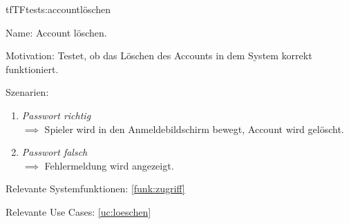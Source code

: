 \begin{description}[leftmargin=5em, style=sameline]

\begin{lhp}{tf}{TF}{tests:accountlöschen}
	\item [Name:] Account löschen.
	\item [Motivation:] Testet, ob das Löschen des Accounts in dem System korrekt funktioniert.
	\item [Szenarien:] \hfill
		\begin{enumerate}
			\item \textit{Passwort richtig} \\ $\implies$ Spieler wird in den Anmeldebildschirm bewegt, Account wird gelöscht.
			\item \textit{Passwort falsch} \\ $\implies$ Fehlermeldung wird angezeigt.
	
		\end{enumerate}
	\item [Relevante Systemfunktionen:] \ref{funk:zugriff}
	\item [Relevante Use Cases:] \ref{uc:loeschen}
\end{lhp}

\end{description}

